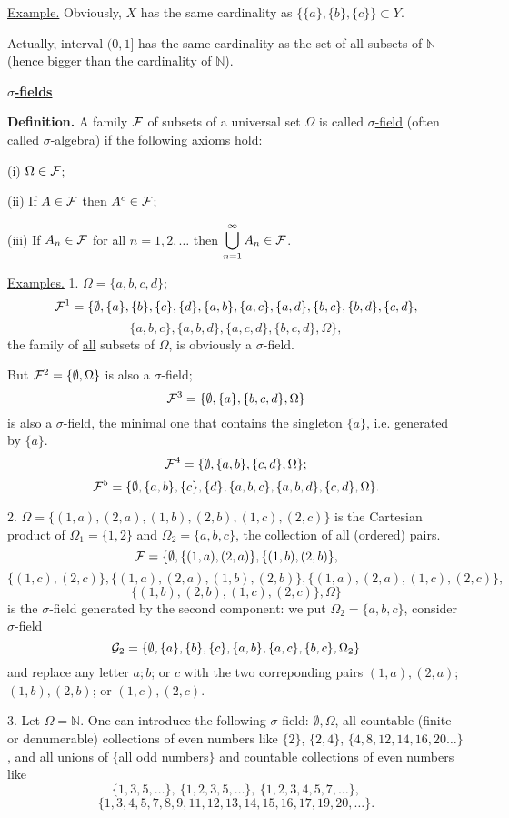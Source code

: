 \documentclass[a4paper,10pt]{article}
\def\NN{\mathbb{N}}
\newcommand{\1}[1]{\mathbf{1}_{\{#1\}}}
\begin{document}
\underline{Example.} Obviously, $X$ has the same cardinality as $\{\{a\},\{b\},\{c\}\}\subset Y$. \vspace{3mm}

Actually, interval $(0,1]$ has the same cardinality as the set of all subsets of $\NN$ (hence bigger than the cardinality of $\NN$).

\begin{center}\bf\underline{$\sigma$-fields} \end{center}

{\bf Definition.}  A family $\cal F$ of subsets of a universal set $\Omega$ is called \underline{$\sigma$-field}  (often called $\sigma$-algebra) if the following axioms hold:

(i) $\Omega\in{\cal F}$;

(ii) If $A\in {\cal F}$ then $A^c\in{\cal F}$;

(iii) If $A_n\in{\cal F}$ for all $n=1,2,\ldots$ then $\displaystyle\bigcup_{n=1}^\infty A_n\in{\cal F}$.\vspace{3mm}

\underline{Examples.} 1. $\Omega=\{a,b,c,d\}$;
  $${\cal F}^1=\{\emptyset,\{a\},\{b\},\{c\},\{d\},\{a,b\},\{a,c\},\{a,d\},\{b,c\},\{b,d\},\{c,d\},$$
  $$\{a,b,c\},\{a,b,d\},\{a,c,d\},\{b,c,d\},\Omega\},$$
the family of \underline{all} subsets of $\Omega$, is obviously a $\sigma$-field.

But ${\cal F}^2=\{\emptyset,\Omega\}$ is also a $\sigma$-field;
  $${\cal F}^3=\{\emptyset, \{a\},\{b,c,d\},\Omega\}$$
is also a $\sigma$-field, the minimal one that contains the singleton $\{a\}$, i.e. \underline{generated} by $\{a\}$.
  $${\cal F}^4=\{\emptyset, \{a,b\},\{c,d\},\Omega\};$$
  $${\cal F}^5=\{\emptyset, \{a,b\},\{c\},\{d\},\{a,b,c\},\{a,b,d\},\{c,d\},\Omega\}.$$

2. $\Omega=\{(1,a),(2,a),(1,b),(2,b),(1,c),(2,c)\}$ is the Cartesian product of $\Omega_1=\{1,2\}$ and $\Omega_2=\{a,b,c\}$, the collection of all (ordered) pairs.
  $${\cal F}=\{\emptyset, \{(1,a),(2,a)\},\{(1,b),(2,b)\},$$
  $$\{(1,c),(2,c)\},\{(1,a),(2,a),(1,b),(2,b)\},\{(1,a),(2,a),(1,c),(2,c)\},$$
  $$\{(1,b),(2,b),(1,c),(2,c)\},\Omega\}$$
is the $\sigma$-field generated by the second component: we put $\Omega_2=\{a,b,c\}$, consider $\sigma$-field
  $${\cal G}_2=\{\emptyset,\{a\},\{b\},\{c\},\{a,b\},\{a,c\},\{b,c\},\Omega_2\}$$
and replace any letter $a;b$; or $c$ with the two correponding pairs $(1,a),(2,a)$; $(1,b),(2,b)$; or $(1,c),(2,c)$.

3. Let $\Omega=\NN$. One can introduce the following $\sigma$-field: $\emptyset,\Omega$, all countable  (finite or denumerable) collections of even numbers like $\{2\}$, $\{2,4\}$, $\{4,8,12,14,16,20\ldots\}$, and all unions of  $\{$all odd numbers$\}$ and countable collections of even numbers like
  $$\{1,3,5,\ldots\},~\{1,2,3,5,\ldots\},~\{1,2,3,4,5,7,\ldots\},$$
  $$\{1,3,4,5,7,8,9,11,12,13,14,15,16,17,19,20,\ldots\}.$$
\end{document}
